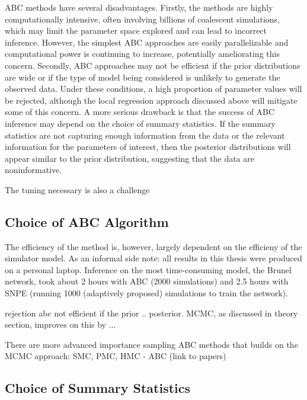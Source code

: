 ABC methods have several disadvantages. Firstly, the methods are highly computationally intensive, often involving billions of coalescent simulations, which may limit the parameter space explored and can lead to incorrect inference. However, the simplest ABC approaches are easily parallelizable and computational power is continuing to increase, potentially ameliorating this concern. Secondly, ABC approaches may not be efficient if the prior distributions are wide or if the type of model being considered is unlikely to generate the observed data. Under these conditions, a high proportion of parameter values will be rejected, although the local regression  approach discussed above will mitigate some of this concern. A more serious drawback is that the success of ABC inference may depend on the choice of summary statistics. If the summary statistics are not capturing enough information from the data or the relevant information for the parameters of interest, then the posterior distributions will appear similar to the prior distribution, suggesting that the data are noninformative. 


The tuning necessary is also a challenge



\subsection{Choice of ABC Algorithm}


The efficiency of the method is, however, largely dependent on the efficieny of the simulator model. As an informal side note: all results in this thesis were produced on a personal laptop. Inference on the most time-consuming model, the Brunel network, took about 2 hours with ABC (2000 simulations) and 2.5 hours with SNPE (running 1000 (adaptively proposed) simulations to train the network). 

rejection abc not efficient if the prior .. posterior. MCMC, as discussed in theory section, improves on this by ... 

There are more advanced importance sampling ABC methods that builds on the MCMC approach: SMC, PMC, HMC - ABC (link to papers)

\subsection{Choice of Summary Statistics}

